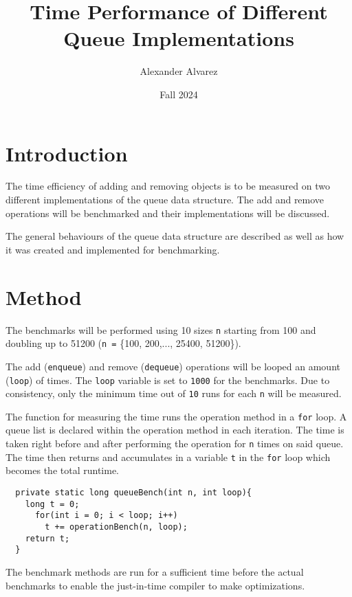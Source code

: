 \documentclass[a4paper,11pt]{article}
\begin{document}
\title{
  \textbf{Time Performance of Different Queue Implementations}
}
\author{Alexander Alvarez}
\date{Fall 2024}

\maketitle

\section*{Introduction}

The time efficiency of adding and removing objects is to be measured 
on two different implementations of the queue data structure. The add 
and remove operations will be benchmarked and their implementations 
will be discussed.

The general behaviours of the queue data structure are described as 
well as how it was created and implemented for benchmarking.

\section*{Method}

The benchmarks will be performed using 10 sizes {\tt n} starting from 
100 and doubling up to 51200 ({\tt n =} \{100, 200,..., 25400, 51200\}).

The add ({\tt enqueue}) and remove ({\tt dequeue}) operations will be 
looped an amount ({\tt loop}) of times. The {\tt loop} variable is set 
to {\tt 1000} for the benchmarks. Due to consistency, only the minimum 
time out of {\tt 10} runs for each {\tt n} will be measured.

The function for measuring the time runs the operation method in a 
{\tt for} loop. A queue list is declared within the operation method 
in each iteration. The time is taken right before and after performing 
the operation for {\tt n} times on said queue. The time then returns 
and accumulates in a variable {\tt t} in the {\tt for} loop which 
becomes the total runtime. 

\begin{verbatim}
  private static long queueBench(int n, int loop){
    long t = 0;
      for(int i = 0; i < loop; i++) 
        t += operationBench(n, loop);
    return t;
  }
\end{verbatim}

The benchmark methods are run for a sufficient time before the actual 
benchmarks to enable the just-in-time compiler to make optimizations.
\end{document}

